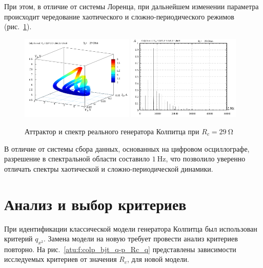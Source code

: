 При этом, в отличие от системы Лоренца,
при дальнейшем изменении параметра происходит чередование
хаотического и сложно-периодического режимов
(рис.~\ref{atu:f:colp_r_attr_f_29}).

\begin{figure}[htb!]
  \centerline{
    \includegraphics[width=0.48\textwidth]{p/r/v1iv2_029000.png}
    \hfill
    \includegraphics[width=0.48\textwidth]{p/r/f_029000.png}
  }
  \caption{Аттрактор и спектр реального генератора Колпитца при $R_c = \SI{29}{\ohm} $}
  \label{atu:f:colp_r_attr_f_29}
\end{figure}

В отличие от системы сбора данных, основанных на цифровом осциллографе,
разрешение в спектральной области составило $\SI{1}{\hertz}$,
что позволило уверенно отличать спектры хаотической
и сложно-периодической динамики.


\section{Анализ и выбор критериев}  %

При идентификации классической модели генератора Колпитца
был использован критерий $q_{x^2}$.
Замена модели на новую требует провести анализ критериев
повторно. На рис.~\ref{atu:f:colp_bjt_q-p_Rc_q}
представлены зависимости исследуемых критериев от значения $R_c$,
для новой модели.

